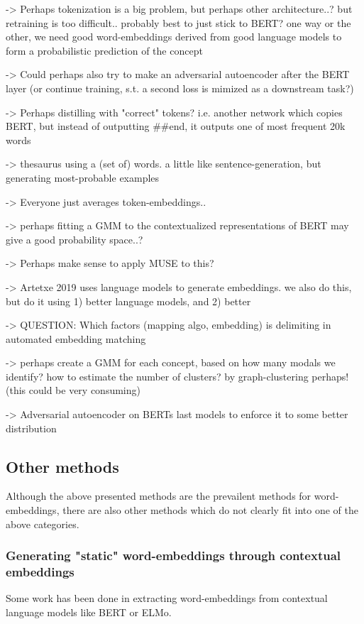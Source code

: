 \documentclass[a4paper,12pt,twoside,openright]{report}
\begin{document}
-> Perhaps tokenization is a big problem, but perhaps other architecture..? but retraining is too difficult.. probably best to just stick to BERT? one way or the other, we need good word-embeddings derived from good language models to form a probabilistic prediction of the concept


-> Could perhaps also try to make an adversarial autoencoder after the BERT layer (or continue training, s.t. a second loss is mimized as a downstream task?)

-> Perhaps distilling with "correct" tokens? i.e. another network which copies BERT, but instead of outputting \#\#end, it outputs one of most frequent 20k words

-> thesaurus using a (set of) words. a little like sentence-generation, but generating most-probable examples

-> Everyone just averages token-embeddings..

-> perhaps fitting a GMM to the contextualized representations of BERT may give a good probability space..?

-> Perhaps make sense to apply MUSE to this?

-> Artetxe 2019 uses language models to generate embeddings. we also do this, but do it using 1) better language models, and 2) better 

-> QUESTION: Which factors (mapping algo, embedding) is delimiting in automated embedding matching

-> perhaps create a GMM for each concept, based on how many modals we identify? how to estimate the number of clusters? by graph-clustering perhaps! (this could be very consuming)

-> Adversarial autoencoder on BERTs last models to enforce it to some better distribution

\subsection{Other methods}

Although the above presented methods are the prevailent methods for word-embeddings, there are also other methods which do not clearly fit into one of the above categories.

\subsubsection{Generating "static" word-embeddings through contextual embeddings}

Some work has been done in extracting word-embeddings from contextual language models like BERT or ELMo.
\end{document}
